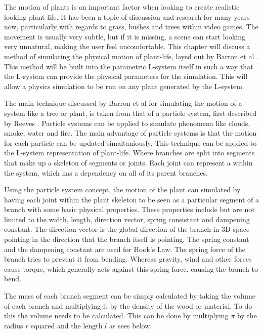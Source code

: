 

\lettrine[lines=3]{T}{}he motion of plants is an important factor when looking to create realistic looking plant-life. It has been a topic of discussion and research for many years now, particularly with regards to grass, bushes and trees within video games. The movement is usually very subtle, but if it is missing, a scene can start looking very unnatural, making the user feel uncomfortable. This chapter will discuss a method of simulating the physical motion of plant-life, layed out by Barron et al \cite{barron2001real}. This method will be built into the parametric L-system itself in such a way that the L-system can provide the physical parameters for the simulation. This will allow a physics simulation to be run on any plant generated by the L-system.

The main technique discussed by Barron et al for simulating the motion of a system like a tree or plant, is taken from that of a particle system, first described by Reeves \cite{reeves1983particle}. Particle systems can be applied to simulate phenomena like clouds, smoke, water and fire. The main advantage of particle systems is that the motion for each particle can be updated simaltaniously. This technique can be applied to the L-system representation of plant-life. Where branches are split into segments that make up a skeleton of segments or joints. Each joint can represent a  within the system, which has a dependency on all of its parent branches.

Using the particle system concept, the motion of the plant can simulated by having each joint within the plant skeleton to be seen as a particular segment of a branch with some basic physical properties. These properties include but are not limited to the width, length, direction vector, spring consistant and dampening constant. The direction vector is the global direction of the branch in 3D space pointing in the direction that the branch itself is pointing. The spring constant and the dampening constant are used for Hook's Law. The spring force of the branch tries to prevent it from bending. Whereas gravity, wind and other forces cause torque, which generally acts against this spring force, causing the branch to bend.

The mass of each branch segment can be simply calculated by taking the volume of each branch and multiplying it by the density of the wood or material. To do this the volume needs to be calculated. This can be done by multiplying $\pi$ by the radius $r$ squared and the length $l$ as sees below.

